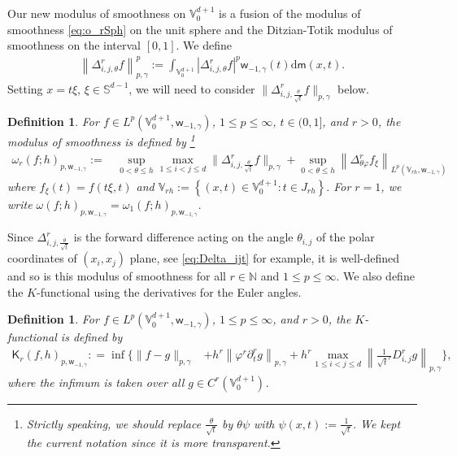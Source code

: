 \documentclass{amsart}
\newtheorem{defn}[thm]{Definition}
\theoremstyle{remark}
\def\d{\mathrm{d}}
\def\sph{{\mathbb{S}^{d-1}}}
\def\g{{\gamma}}
\def\t{{\theta}}
\def\o{{\omega}}
\def\NN{{\mathbb N}}
\def\VV{{\mathbb V}}
\def\d{\mathrm{d}}
\def\sph{{\mathbb{S}^{d-1}}}
\def\sK{{\mathsf K}}
\def\sm{{\mathsf m}}
\def\sw{{\mathsf w}}
\def\g{{\gamma}}
\def\t{{\theta}}
\def\o{{\omega}}
\def\NN{{\mathbb N}}
\def\VV{{\mathbb V}}
\def\f{\frac}
\def\f{\frac}
\begin{document}
Our new modulus of smoothness on $\VV_0^{d+1}$ is a fusion of the modulus of smoothness \eqref{eq:o_rSph} 
on the unit sphere and the Ditzian-Totik modulus of smoothness on the interval $[0,1]$. We define 
\begin{align*}
\left\| \Delta_{i,j,\t}^r f\right\|_{p,\g}^p := \int_{\VV_0^{d+1}} \left|  \Delta_{i,j,\t}^r f \right|^p \sw_{-1,\g}(t) \d \sm(x,t).
\end{align*}
Setting $x = t \xi$, $\xi \in \sph$, we will need to consider  $\|\Delta_{i,j,\frac{\t}{\sqrt{t}}}^r f \|_{p,\g}$ 
below. 

\begin{defn}\label{def:modulusV0}
For $f\in L^p(\VV_0^{d+1},  \sw_{-1,\g})$, $1\leq p \le \infty$, $t\in(0,1]$, and $r > 0$, the modulus of smoothness is defined by
\footnote{Strictly speaking, we should replace $\f \t {\sqrt{t}}$ by $\t \psi$ with $\psi(x,t):= \frac1{\sqrt{t}}$. We kept the current
notation since it is more transparent.}
\begin{align*}
  \o_r(f; h)_{p,\sw_{-1,\g}} := \,& \sup_{0 < \t \le h}   \max_{1\leq i < j \leq d }
  	\Big\| \Delta_{i,j, \frac{\t}{\sqrt{t}}}^r f\Big\|_{p,\g}+\sup_{0<\t \le h} 
	      \left\| \Delta_{\t\varphi}^r f_\xi \right\|_{L^p(\VV_{r h}, \sw_{-1,\g}) } 
\end{align*} 
where $f_\xi(t) = f(t \xi, t)$ and $ \VV_{r h}:= \left\{(x,t) \in \VV_0^{d+1}:  t\in J_{rh}\right\}.$ 
For $r=1$, we write $\o(f; h)_{p,\sw_{-1,\g}}=\o_1(f; h)_{p, \sw_{-1,\g}}.$
\end{defn} 
   
Since $\Delta_{i,j, \frac{\t}{\sqrt{t}}}^r$ is the forward difference acting on the angle $\t_{i,j}$ of the polar coordinates of 
$(x_i,x_j)$ plane, see \eqref{eq:Delta_ijt} for example, it is well-defined and so is this modulus of smoothness for 
all $r \in \NN$ and $1 \le p \le \infty$. We also define the $K$-functional using the derivatives for the Euler angles. 
 
\begin{defn}\label{eq:cs-K-func}
For $f\in L^p(\VV_0^{d+1}, \sw_{-1,\g})$, $1\leq p \le \infty$, and $r > 0$, the $K$-functional is defined by 
\begin{align*}
 \sK_r(f, h)_{p,\sw_{-1,\g}}: = \inf 
  	  \bigg \{ \|f-g\|_{p, \g}  & + h^r \left\|\varphi^r \partial^r_t g \right\|_{p, \g} 
	      + h^r  \max_{1\le i < j \le d} \left\| \f{1}{\sqrt{t}^r}D_{i,j}^r g\right\|_{p, \g} \bigg \},
\end{align*}
where the infimum is taken over all $g \in C^r(\VV_0^{d+1})$.
 \end{defn}  
\end{document}
